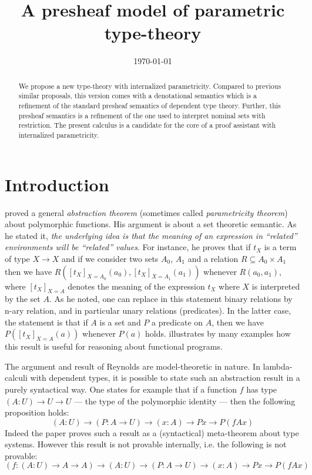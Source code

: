 \documentclass[english]{PaperTools/latex/lipics}
\title{A presheaf model of parametric type-theory}
\author{}
\date{\today}
\begin{document}
\maketitle

\begin{abstract}
  We propose a new type-theory with internalized
  parametricity. Compared to previous similar proposals, this version
  comes with a denotational semantics which is a refinement of the
  standard presheaf semantics of dependent type theory. Further, this
  presheaf semantics is a refinement of the one used to interpret
  nominal sets with restriction.  The present calculus is a candidate for the
  core of a proof assistant with internalized parametricity.
\end{abstract}

\section{Introduction}
\cite{reynolds_types_1983} proved a general \emph{abstraction theorem} (sometimes called
\emph{parametricity theorem}) about polymorphic functions. His argument is
about a set theoretic semantic.  As he stated it, {\em the underlying
  idea is that the meaning of an expression in ``related''
  environments will be ``related'' values}.  For instance, he proves
that if $t_X$ is a term of type $X → X$ and if we consider two sets
$A_0$, $A_1$ and a relation $R ⊆ A_0 × A_1$ then we have
$R([t_X]_{X=A_0}(a_0),[t_X]_{X=A_1}(a_1))$ whenever $R(a_0,a_1)$,
where $[t_X]_{X=A}$ denotes the meaning of the expression $t_X$ where
$X$ is interpreted by the set $A$. As he noted, one can replace in
this statement binary relations by n-ary relation, and in particular
unary relations (predicates). In the latter case, the statement is that
if $A$ is a set and $P$ a predicate on $A$, then we have
$P([t_X]_{X=A}(a))$ whenever $P(a)$ holds.
\cite{wadler_theorems_1989} illustrates by many examples how this
result is useful for reasoning about functional programs.

The argument and result of Reynolds are model-theoretic in nature.
In lambda-calculi with dependent types, it is possible to state such an
abstraction result in a purely syntactical way.
One states for example that if a function $f$ has type
$(A : U) → U → U$ --- the type of the polymorphic identity --- then the
following proposition holds:
$$ (A : U) → (P : A → U) → (x : A) → P x → P (f A x) $$
%
Indeed the paper \cite{bernardy_proofs_2012} proves such a result as a
(syntactical) meta-theorem about type systems. However this result is
not provable internally, i.e. the following is not provable:
$$ (f : (A:U) → A → A) →  (A : U) → (P : A → U) → (x : A) → P x → P (f A x) $$
\end{document}
